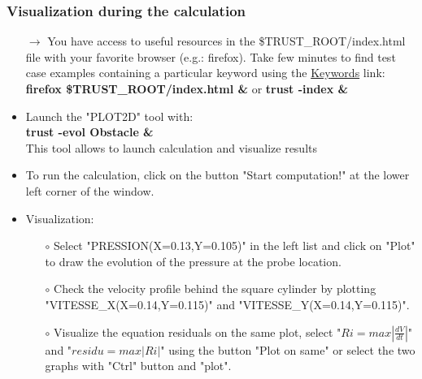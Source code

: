 \documentclass[10pt, hyperref={unicode=true,pdfusetitle, bookmarks=true,bookmarksnumbered=false,bookmarksopen=false, breaklinks=false,pdfborder={0 0 1},backref=true,colorlinks=true,linkcolor=darkblue,pageanchor}]{beamer}
\begin{document}
\begin{frame}
\frametitle{Visualization during the calculation}
\begin{block}{}

\begin{itemize}
\item [$\rightarrow$] You have access to useful resources in the \$TRUST\_ROOT/index.html file with your favorite browser (e.g.: firefox). Take few minutes to find test case examples containing a particular keyword using the \underline{Keywords} link: \\
\textbf{firefox \$TRUST\_ROOT/index.html \&} 
or \textbf{trust -index \&}\\

\item Launch the "PLOT2D" tool with: \\
\textbf{trust -evol Obstacle \&} \\
This tool allows to launch calculation and visualize results

\item To run the calculation, click on the button "Start computation!" at the lower left corner of the window.

\item Visualization:
    \begin{itemize}
    \item [$\circ$] Select "PRESSION(X=0.13,Y=0.105)" in the left list  and click on "Plot" to draw the evolution of the pressure at the probe location.
    \item [$\circ$] Check the velocity profile behind the square cylinder by plotting "VITESSE\_X(X=0.14,Y=0.115)" and "VITESSE\_Y(X=0.14,Y=0.115)".
    \item [$\circ$] Visualize the equation residuals on the same plot, select "$ Ri = max \left| \frac{dV}{dt} \right|$" and "$residu = max \left| Ri \right|$" using the button "Plot on same" or select the two graphs with "Ctrl" button and "plot".
    \end{itemize}


\end{itemize}
\end{block}
\end{frame}
\end{document}
